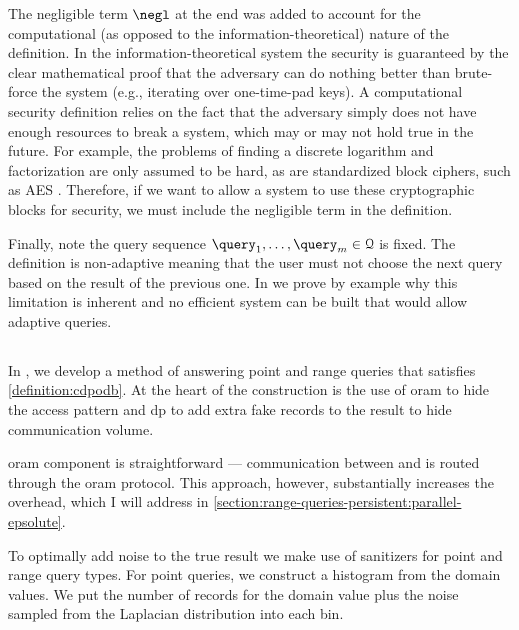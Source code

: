 			The negligible term $\negl$ at the end was added to account for the computational (as opposed to the information-theoretical) nature of the definition.
			In the information-theoretical system the security is guaranteed by the clear mathematical proof that the adversary can do nothing better than brute-force the system (e.g., iterating over one-time-pad keys).
			A computational security definition relies on the fact that the adversary simply does not have enough resources to break a system, which may or may not hold true in the future.
			For example, the problems of finding a discrete logarithm and factorization are only assumed to be hard, as are standardized block ciphers, such as AES \cite{aes-nist}.
			Therefore, if we want to allow a system to use these cryptographic blocks for security, we must include the negligible term in the definition.

			Finally, note the query sequence $\fromNtoM{\query}{1}{m} \in \querySet$ is fixed.
			The definition is non-adaptive meaning that the user \user{} must not choose the next query based on the result of the previous one.
			In \cite[Section 3.1.1]{epsolute} we prove by example why this limitation is inherent and no efficient system can be built that would allow adaptive queries.

		\subsection{\epsolute{}}

			In \epsolute{} \cite{epsolute}, we develop a method of answering point and range queries that satisfies \cref{definition:cdpodb}.
			At the heart of the construction is the use of \acrshort{oram} to hide the access pattern and \acrshort{dp} to add extra fake records to the result to hide communication volume.

			\acrshort{oram} component is straightforward --- communication between \user{} and \server{} is routed through the \acrshort{oram} protocol.
			This approach, however, substantially increases the overhead, which I will address in \cref{section:range-queries-persistent:parallel-epsolute}.

			To optimally add noise to the true result we make use of sanitizers for point and range query types.
			For point queries, we construct a histogram from the domain values.
			We put the number of records for the domain value plus the noise sampled from the Laplacian distribution into each bin.

			

